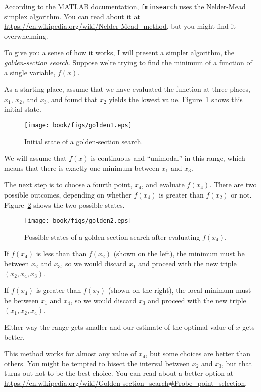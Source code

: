 According to the MATLAB documentation, {\tt fminsearch} uses the Nelder-Mead simplex algorithm.  You can read about it at \url{https://en.wikipedia.org/wiki/Nelder-Mead\_method}, but you might find it overwhelming.


To give you a sense of how it works, I will present a simpler algorithm, the \emph{golden-section search}.  Suppose we're trying to find the minimum of a function of a single variable, $f(x)$.  

As a starting place, assume that we have evaluated the function at three places, 
$x_1$, $x_2$, and $x_3$, and found that $x_2$ yields the lowest
value. Figure~\ref{fig:golden1} shows this initial state.

\begin{figure}[ht]
\centerline{\texttt{[image: book/figs/golden1.eps]}}
\caption{Initial state of a golden-section search.}
\label{fig:golden1}
\end{figure}

We will assume that $f(x)$ is continuous and ``unimodal'' in this range, which means that there is exactly one minimum between $x_1$ and $x_3$.


The next step is to choose a fourth point, $x_4$, and evaluate
$f(x_4)$.  There are two possible outcomes, depending on whether
$f(x_4)$ is greater than $f(x_2)$ or not.
Figure~\ref{fig:golden2} shows the two possible states.

\begin{figure}[ht]
\centerline{\texttt{[image: book/figs/golden2.eps]}}
\caption{Possible states of a golden-section search after evaluating $f(x_4)$.}
\label{fig:golden2}
\end{figure}

If $f(x_4)$ is less than than $f(x_2)$ (shown on the left), the
minimum must be between $x_2$ and $x_3$, so we would discard $x_1$ and proceed with the new triple $(x_2, x_4, x_3)$.

If $f(x_4)$ is greater than $f(x_2)$ (shown on the right), the
local minimum must be between $x_1$ and $x_4$, so we would discard $x_3$ and proceed with the new triple $(x_1, x_2, x_4)$.

Either way the range gets smaller and our estimate of the optimal value of $x$ gets better.

This method works for almost any value of $x_4$, but some choices
are better than others.  You might be tempted to bisect the interval between $x_2$ and $x_3$, but that turns out not to be the best choice.  You can read about a better option at \url{https://en.wikipedia.org/wiki/Golden-section_search#Probe_point_selection}.

